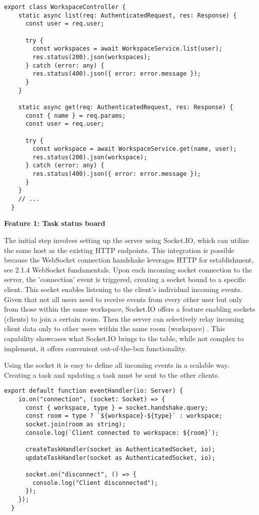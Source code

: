 \begin{lstlisting}[caption=WorkspaceController]
  export class WorkspaceController {
    static async list(req: AuthenticatedRequest, res: Response) {
      const user = req.user;
   
      try {
        const workspaces = await WorkspaceService.list(user);
        res.status(200).json(workspaces);
      } catch (error: any) {
        res.status(400).json({ error: error.message });
      }
    }
   
    static async get(req: AuthenticatedRequest, res: Response) {
      const { name } = req.params;
      const user = req.user;
   
      try {
        const workspace = await WorkspaceService.get(name, user);
        res.status(200).json(workspace);
      } catch (error: any) {
        res.status(400).json({ error: error.message });
      }
    }
    // ...
  }   
\end{lstlisting}

\textbf{Feature 1: Task status board}

The initial step involves setting up the server using Socket.IO, which can utilize the same host as the existing HTTP endpoints. This integration is possible because the WebSocket connection handshake leverages HTTP for establishment, see 2.1.4 WebSocket fundamentals. Upon each incoming socket connection to the server, the 'connection' event is triggered, creating a socket bound to a specific client. This socket enables listening to the client's individual incoming events. Given that not all users need to receive events from every other user but only from those within the same workspace, Socket.IO offers a feature enabling sockets (clients) to join a certain room. Then the server can selectively relay incoming client data only to other users within the same room (workspace) \cite{socketio}. This capability showcases what Socket.IO brings to the table, while not complex to implement, it offers convenient out-of-the-box functionality.

Using the socket it is easy to define all incoming events in a scalable way. Creating a task and updating a task must be sent to the other clients.

\begin{lstlisting}[caption=WebSocket connection event handler]
  export default function eventHandler(io: Server) {
    io.on("connection", (socket: Socket) => {
      const { workspace, type } = socket.handshake.query;
      const room = type ? `${workspace}-${type}` : workspace;
      socket.join(room as string);
      console.log(`Client connected to workspace: ${room}`);
   
      createTaskHandler(socket as AuthenticatedSocket, io);
      updateTaskHandler(socket as AuthenticatedSocket, io);
   
      socket.on("disconnect", () => {
        console.log("Client disconnected");
      });
    });
  }
\end{lstlisting}

